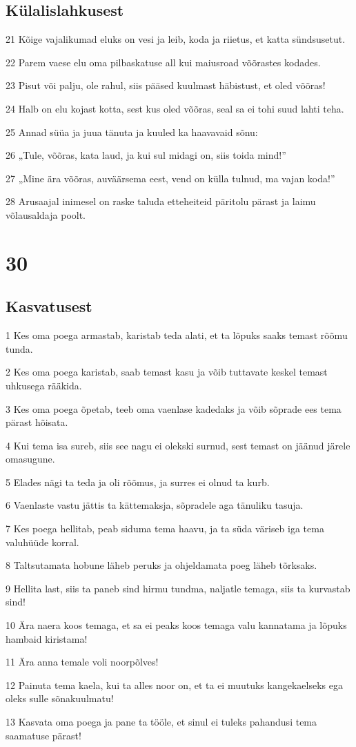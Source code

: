 \section*{Külalislahkusest}

\par 21 Kõige vajalikumad eluks on vesi ja leib, koda ja riietus, et katta sündsusetut.
\par 22 Parem vaese elu oma pilbaskatuse all kui maiusroad võõrastes kodades.
\par 23 Pisut või palju, ole rahul, siis pääsed kuulmast häbistust, et oled võõras!
\par 24 Halb on elu kojast kotta, sest kus oled võõras, seal sa ei tohi suud lahti teha.
\par 25 Annad süüa ja juua tänuta ja kuuled ka haavavaid sõnu:
\par 26 „Tule, võõras, kata laud, ja kui sul midagi on, siis toida mind!”
\par 27 „Mine ära võõras, auväärsema eest, vend on külla tulnud, ma vajan koda!”
\par 28 Arusaajal inimesel on raske taluda etteheiteid päritolu pärast ja laimu võlausaldaja poolt.

\chapter{30}

\section*{Kasvatusest}

\par 1 Kes oma poega armastab, karistab teda alati, et ta lõpuks saaks temast rõõmu tunda.
\par 2 Kes oma poega karistab, saab temast kasu ja võib tuttavate keskel temast uhkusega rääkida.
\par 3 Kes oma poega õpetab, teeb oma vaenlase kadedaks ja võib sõprade ees tema pärast hõisata.
\par 4 Kui tema isa sureb, siis see nagu ei olekski surnud, sest temast on jäänud järele omasugune.
\par 5 Elades nägi ta teda ja oli rõõmus, ja surres ei olnud ta kurb.
\par 6 Vaenlaste vastu jättis ta kättemaksja, sõpradele aga tänuliku tasuja.
\par 7 Kes poega hellitab, peab siduma tema haavu, ja ta süda väriseb iga tema valuhüüde korral.
\par 8 Taltsutamata hobune läheb peruks ja ohjeldamata poeg läheb tõrksaks.
\par 9 Hellita last, siis ta paneb sind hirmu tundma, naljatle temaga, siis ta kurvastab sind!
\par 10 Ära naera koos temaga, et sa ei peaks koos temaga valu kannatama ja lõpuks hambaid kiristama!
\par 11 Ära anna temale voli noorpõlves!
\par 12 Painuta tema kaela, kui ta alles noor on, et ta ei muutuks kangekaelseks ega oleks sulle sõnakuulmatu!
\par 13 Kasvata oma poega ja pane ta tööle, et sinul ei tuleks pahandusi tema saamatuse pärast!

